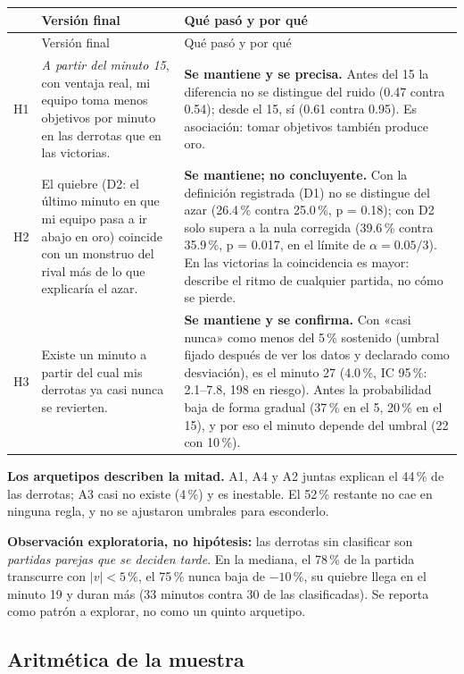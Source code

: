 \documentclass[11pt,letterpaper]{article}
\begin{document}
\begin{longtable}{p{1.0cm}p{6.4cm}p{7.2cm}}
\toprule
 & Versión final & Qué pasó y por qué \\
\midrule
\endfirsthead
\toprule
 & Versión final & Qué pasó y por qué \\
\midrule
\endhead
H1 & \emph{A partir del minuto 15}, con ventaja real, mi equipo toma menos objetivos por minuto en las derrotas que en las victorias. & \textbf{Se mantiene y se precisa.} Antes del 15 la diferencia no se distingue del ruido (0.47 contra 0.54); desde el 15, sí (0.61 contra 0.95). Es asociación: tomar objetivos también produce oro. \\
\addlinespace
H2 & El quiebre (D2: el último minuto en que mi equipo pasa a ir abajo en oro) coincide con un monstruo del rival más de lo que explicaría el azar. & \textbf{Se mantiene; no concluyente.} Con la definición registrada (D1) no se distingue del azar (26.4\,\% contra 25.0\,\%, p = 0.18); con D2 solo supera a la nula corregida (39.6\,\% contra 35.9\,\%, p = 0.017, en el límite de \(\alpha = 0.05/3\)). En las victorias la coincidencia es mayor: describe el ritmo de cualquier partida, no cómo se pierde. \\
\addlinespace
H3 & Existe un minuto a partir del cual mis derrotas ya casi nunca se revierten. & \textbf{Se mantiene y se confirma.} Con «casi nunca» como menos del 5\,\% sostenido (umbral fijado después de ver los datos y declarado como desviación), es el minuto 27 (4.0\,\%, IC 95\,\%: 2.1--7.8, 198 en riesgo). Antes la probabilidad baja de forma gradual (37\,\% en el 5, 20\,\% en el 15), y por eso el minuto depende del umbral (22 con 10\,\%). \\
\bottomrule
\end{longtable}

\noindent \textbf{Los arquetipos describen la mitad.} A1, A4 y A2 juntas explican el
44\,\% de las derrotas; A3 casi no existe (4\,\%) y es inestable. El 52\,\% restante
no cae en ninguna regla, y no se ajustaron umbrales para esconderlo.

\noindent \textbf{Observación exploratoria, no hipótesis:} las derrotas sin clasificar
son \emph{partidas parejas que se deciden tarde}. En la mediana, el 78\,\% de la
partida transcurre con \(|v| < 5\)\,\%, el 75\,\% nunca baja de \(-10\)\,\%, su
quiebre llega en el minuto 19 y duran más (33 minutos contra 30 de las clasificadas).
Se reporta como patrón a explorar, no como un quinto arquetipo.

\subsection{Aritmética de la muestra}
\end{document}
